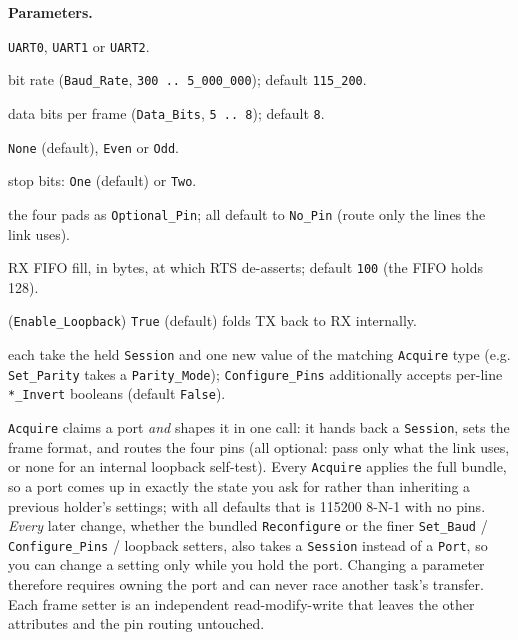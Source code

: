 \textbf{Parameters.}
\begin{description}[style=nextline]
\item[\texttt{Port}] \texttt{UART0}, \texttt{UART1} or \texttt{UART2}.
\item[\texttt{Baud}] bit rate (\texttt{Baud\_Rate}, \texttt{300\,..\,5\_000\_000});
  default \texttt{115\_200}.
\item[\texttt{Bits}] data bits per frame (\texttt{Data\_Bits}, \texttt{5\,..\,8});
  default \texttt{8}.
\item[\texttt{Parity}] \texttt{None} (default), \texttt{Even} or \texttt{Odd}.
\item[\texttt{Stop}] stop bits: \texttt{One} (default) or \texttt{Two}.
\item[\texttt{Tx}, \texttt{Rx}, \texttt{Rts}, \texttt{Cts}] the four pads as
  \texttt{Optional\_Pin}; all default to \texttt{No\_Pin} (route only the lines the
  link uses).
\item[\texttt{Rx\_Flow\_Threshold}] RX FIFO fill, in bytes, at which RTS
  de-asserts; default \texttt{100} (the FIFO holds 128).
\item[\texttt{On}] (\texttt{Enable\_Loopback}) \texttt{True} (default) folds TX back
  to RX internally.
\item[the \texttt{Set\_*} setters] each take the held \texttt{Session} and one new
  value of the matching \texttt{Acquire} type (e.g. \texttt{Set\_Parity} takes a
  \texttt{Parity\_Mode}); \texttt{Configure\_Pins} additionally accepts per-line
  \texttt{*\_Invert} booleans (default \texttt{False}).
\end{description}

\texttt{Acquire} claims a port \emph{and} shapes it in one call: it hands back a
\texttt{Session}, sets the frame format, and routes the four pins (all optional:
pass only what the link uses, or none for an internal loopback self-test). Every
\texttt{Acquire} applies the full bundle, so a port comes up in exactly the state
you ask for rather than inheriting a previous holder's settings; with all defaults
that is 115200 8-N-1 with no pins. \emph{Every} later change, whether the bundled
\texttt{Reconfigure} or the finer \texttt{Set\_Baud} / \texttt{Configure\_Pins} /
loopback setters, also takes a \texttt{Session} instead of a \texttt{Port}, so you
can change a setting only while you hold the port. Changing a parameter therefore
requires owning the port and can never race another task's transfer. Each frame
setter is an independent read-modify-write that leaves the other attributes and
the pin routing untouched.

